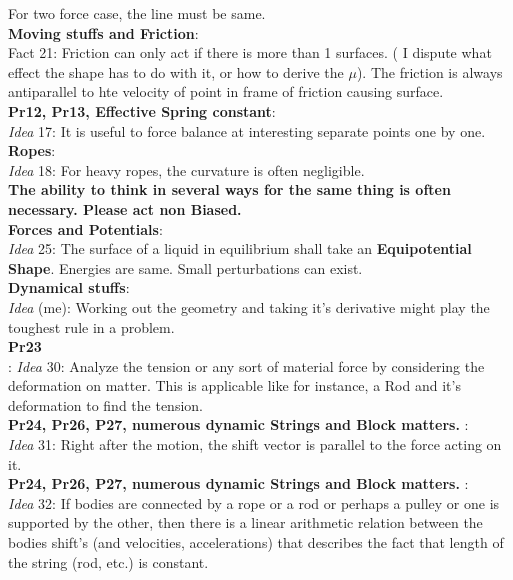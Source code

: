 \documentclass[a4paper]{article}
\theoremstyle{definition}
\begin{document}
For two force case, the line must be same. \\
\textsf{\textbf{Moving stuffs and Friction}}:\\
 Fact 21: Friction can only act if there is more than 1 surfaces. ( I dispute what effect the shape has to do with it, or how to derive the $\mu$). The friction is always antiparallel to hte velocity of point in frame of friction causing surface. \\
\textsf{\textbf{Pr12, Pr13, Effective Spring constant}}:\\ \emph{Idea} 17: It is useful to force balance at interesting separate points one by one. \\
\textsf{\textbf{Ropes}}:\\
 \emph{Idea} 18: For heavy ropes, the curvature is often negligible. \\
\textsf{\textbf{The ability to think in several ways for the same thing is often necessary. Please act non Biased. }} \\
\textsf{\textbf{Forces and Potentials}}:\\ \emph{Idea} 25: The surface of a liquid in equilibrium shall take an \textbf{Equipotential Shape}. Energies are same. Small perturbations can exist. \\
\textsf{\textbf{Dynamical stuffs}}:\\ \emph{Idea} (me): Working out the geometry and taking it's derivative might play the toughest rule in a problem. \\
\textsf{\textbf{Pr23}} \\
: \emph{Idea} 30: Analyze the tension or any sort of material force by considering the deformation on matter. This is applicable like for instance, a Rod and it's deformation to find the tension. \\
\textsf{\textbf{Pr24, Pr26, P27, numerous dynamic Strings and Block matters. }}:\\ \emph{Idea} 31: Right after the motion, the shift vector is parallel to the force acting on it.\\
\textsf{\textbf{Pr24, Pr26, P27, numerous dynamic Strings and Block matters. }}:\\
 \emph{Idea} 32: If bodies are connected by a rope or a rod or perhaps a pulley or one is supported by the other, then there is a linear arithmetic relation between the bodies shift's (and velocities, accelerations) that describes the fact that length of the string (rod, etc.) is constant. \\
\end{document}
